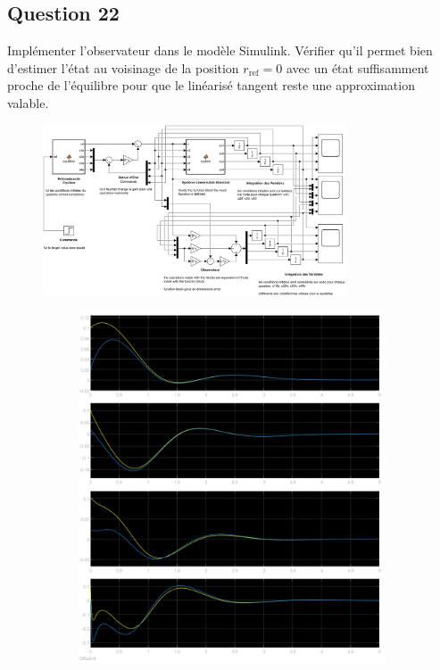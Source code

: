 \documentclass[class=article, crop=false]{standalone}
\begin{document}
\subsection{Question 22}
\begin{exercise}
    Implémenter l'observateur dans le modèle Simulink. Vérifier qu'il permet bien d'estimer l'état au voisinage de la position $r_{\text{ref}} = 0$ avec un état suffisamment proche de l'équilibre pour que le linéarisé tangent reste une approximation valable.
\end{exercise}
\begin{resolution}
    \begin{figure}[H]
        \centering
        \includegraphics[width=0.8\textwidth]{../images/system_simulink_4.png}
        \caption{}
    \end{figure}
    \begin{figure}[H]
        \centering
        \begin{subfigure}[b]{0.475\textwidth}
            \centering
            \includegraphics[width=\textwidth]{../images/simulink_scope5_0_1_02.png}

\end{subfigure}
\end{figure}
\end{resolution}
\end{document}
